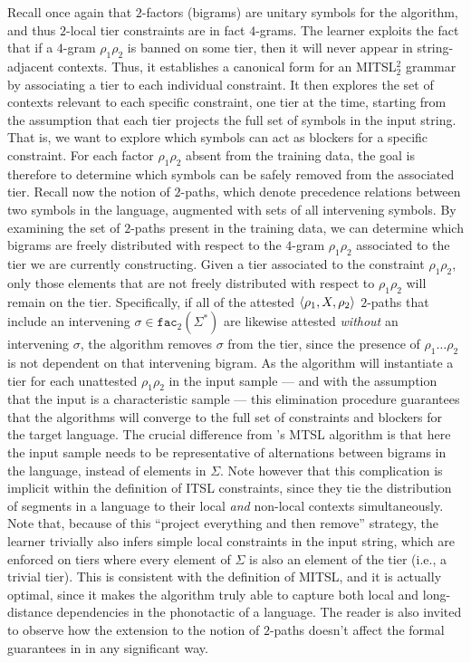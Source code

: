 \documentclass[11pt,a4paper]{article}
\newcommand{\facn}[1]{\ensuremath{\texttt{fac}_{#1}}}
\begin{document}
Recall once again that $2$-factors (bigrams) are unitary symbols for the algorithm, and thus $2$-local tier constraints are in fact $4$-grams.
The learner exploits the fact that if a $4$-gram $\rho_1\rho_2$ is banned on some tier, then it will never appear in string-adjacent contexts.
Thus, it establishes a canonical form for an MITSL$^2_2$ grammar by associating a tier to each individual constraint.
It then explores the set of contexts relevant to each specific constraint, one tier at the time, starting from the assumption that each tier projects the full set of symbols in the input string.
That is, we want to explore which symbols can act as blockers for a specific constraint.
 For each factor $\rho_1\rho_2$ absent from the training data, the goal is therefore to determine which symbols can be safely removed from the associated tier. 
Recall now the notion of $2$-paths, which denote precedence relations between two symbols in the language, augmented with sets of all intervening symbols.
By examining the set of $2$-paths present in the training data, we can determine which bigrams are freely distributed with respect to the $4$-gram $\rho_1\rho_2$ associated to the tier we are currently constructing. 
Given a tier associated to the constraint  $\rho_1\rho_2$, only those elements that are not freely distributed with respect to  $\rho_1\rho_2$ will remain on the tier.
  Specifically, if all of the attested $\langle{\rho_1, X, \rho_2}\rangle$ $2$-paths that include an intervening $\sigma \in \facn{2}(\Sigma^*)$ are likewise attested \emph{without} an intervening $\sigma$, the algorithm removes $\sigma$ from the tier, since the presence of $\rho_1\ldots{}\rho_2$ is not dependent on that intervening bigram.
As the algorithm will instantiate a tier for each unattested   $\rho_1\rho_2$ in the input sample --- and  with the assumption that the input is a characteristic sample  --- this elimination procedure guarantees that the algorithms will converge to the full set of constraints and blockers for the target language.
  The crucial difference from \citet{McMullinSCIL2019}'s MTSL algorithm is that here the input sample needs to be representative of alternations between bigrams in the language, instead of elements in $\Sigma$.
  Note however that this complication is implicit within the definition of ITSL constraints, since they tie the distribution of segments in a language to their local \emph{and} non-local contexts simultaneously.
  Note that, because of this ``project everything and then remove'' strategy, the learner trivially also infers simple local constraints in the input string, which are enforced on tiers where every element of $\Sigma$ is also an element of the tier (i.e., a trivial tier).
  This is consistent with the definition of MITSL, and it is actually optimal, since it makes the algorithm truly able to capture both local and long-distance dependencies in the phonotactic of a language.
  The reader is also invited to observe how the extension to the notion of $2$-paths doesn't affect the formal guarantees in \citep{JardineHeinz16} in any significant way.
\end{document}

